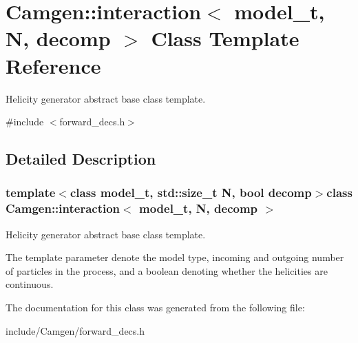 \hypertarget{a00309}{\section{Camgen\-:\-:interaction$<$ model\-\_\-t, N, decomp $>$ Class Template Reference}
\label{a00309}
}


Helicity generator abstract base class template.  




{\ttfamily \#include $<$forward\-\_\-decs.\-h$>$}



\subsection{Detailed Description}
\subsubsection*{template$<$class model\-\_\-t, std\-::size\-\_\-t N, bool decomp$>$class Camgen\-::interaction$<$ model\-\_\-t, N, decomp $>$}

Helicity generator abstract base class template. 

The template parameter denote the model type, incoming and outgoing number of particles in the process, and a boolean denoting whether the helicities are continuous. 

The documentation for this class was generated from the following file\-:\begin{DoxyCompactItemize}
\item 
include/\-Camgen/forward\-\_\-decs.\-h\end{DoxyCompactItemize}
